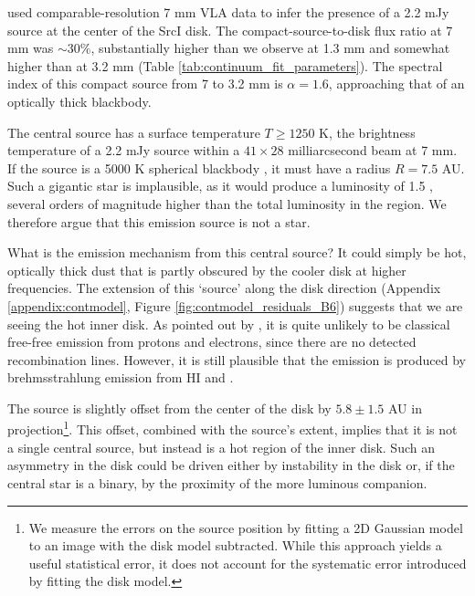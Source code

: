 \documentclass[twocolumn]{aastex61}
\newcommand{\sourcei}{SrcI\xspace}
\begin{document}
\citet{Reid2007a} used comparable-resolution 7 mm VLA data to infer
the presence of a 2.2 mJy source at the center of the \sourcei disk.
The compact-source-to-disk flux ratio at 7 mm was $\sim30\%$, substantially
higher than we observe at 1.3 mm and somewhat
higher than at 3.2 mm (Table \ref{tab:continuum_fit_parameters}).  
The spectral index of this compact source from 7 to 3.2 mm is $\alpha=1.6$,
approaching that of an optically
thick blackbody.

The central source has a surface temperature $T\geq1250$ K, the brightness
temperature of a 2.2 mJy source within a $41\times28$ milliarcsecond beam at 7
mm.  If the source is a 5000 K spherical blackbody \citep[e.g.,][]{Testi2010a},
it must have a radius $R=7.5$ AU.  Such a gigantic star is implausible, as it
would produce a luminosity of 1.5 \lsun, several orders of magnitude
higher than the total luminosity in the region.  We therefore argue
that this emission source is not a star.

What is the emission mechanism from this central source?
It could simply be hot, optically thick dust that is partly obscured by the
cooler disk at higher frequencies.  The  extension of this `source' along the
disk direction (Appendix \ref{appendix:contmodel}, Figure
\ref{fig:contmodel_residuals_B6}) suggests that we are
seeing the hot inner disk.  As pointed out by \citet{Plambeck2016a}, it is
quite unlikely to be classical free-free emission from protons
and electrons, since there are no detected
recombination lines.  However, it is still plausible that the emission is
produced by brehmsstrahlung emission from HI and \hh
\citep{Reid2007a,Baez-Rubio2018a}.

The source is slightly offset from the center of the disk by $5.8\pm1.5$ AU in
projection\footnote{We measure the errors on the source position by fitting a
2D Gaussian model to an image with the disk model subtracted.  While this approach
yields a useful statistical error, it does not account for the systematic error
introduced by fitting the disk model. }.  This offset,
combined with the source's extent, implies that it is
not a single central source, but
instead is a hot region of the inner disk.  Such an asymmetry in the disk could
be driven either by instability in the disk or, if the central star is a
binary, by the proximity of the more luminous companion.
\end{document}
